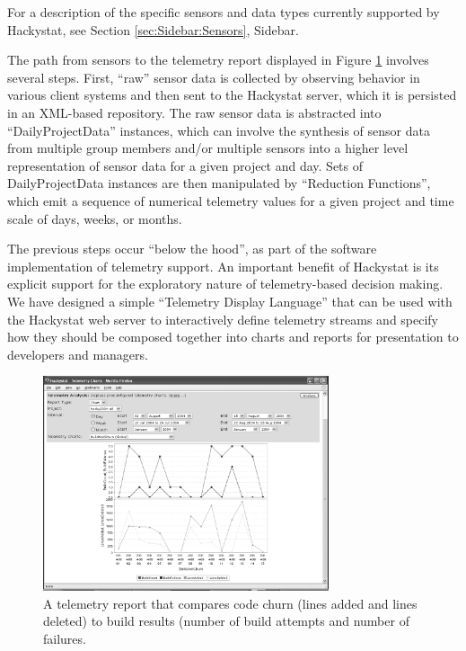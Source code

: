 \documentclass[11pt,twocolumn]{article}
\begin{document}
For a description of the specific sensors and data types currently supported by
Hackystat, see Section \ref{sec:Sidebar:Sensors}, Sidebar.  


The path from sensors to the telemetry report displayed in Figure
\ref{fig:telemetryreport} involves several steps.  First, ``raw'' sensor
data is collected by observing behavior in various client systems and then
sent to the Hackystat server, which it is persisted in an XML-based
repository.  The raw sensor data is abstracted into ``DailyProjectData''
instances, which can involve the synthesis of sensor data from multiple
group members and/or multiple sensors into a higher level representation of
sensor data for a given project and day.   Sets of DailyProjectData
instances are then manipulated by ``Reduction Functions'', which emit a
sequence of numerical telemetry values for a given project and time scale
of days, weeks, or months.  

The previous steps occur ``below the hood'', as part of the software
implementation of telemetry support.  An important benefit of Hackystat is
its explicit support for the exploratory nature of telemetry-based decision
making.  We have designed a simple ``Telemetry Display Language'' that can
be used with the Hackystat web server to interactively define telemetry
streams and specify how they should be composed together into charts and
reports for presentation to developers and managers.

\begin{figure}[ht]
  \centering
  \includegraphics[width=0.75\textwidth]{BuildAndChurn.eps}
  \caption{A telemetry report that compares code churn (lines
  added and lines deleted) to build results (number of build attempts and
  number of failures.} 
  \label{fig:telemetryreport}
\end{figure}
\end{document}
